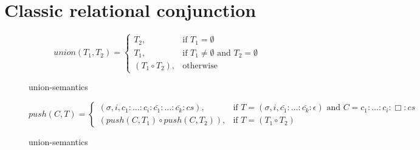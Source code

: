 \section{Classic relational conjunction}

\begin{figure}[h!]
\[
union(T_1, T_2) =
\left\{
\begin{array}{rl}
T_2, & \mbox{if } T_1 = \emptyset \\
T_1, & \mbox{if } T_1 \not= \emptyset \mbox{ and } T_2 = \emptyset \\
(T_1 \circ T_2), & \mbox{otherwise}
\end{array}
\right.
\]
\caption{union-semantics}
\label{fair:union-semantics}
\end{figure}

\begin{figure}[h!]
\[
push(C, T) =
\left\{
\begin{array}{rl}
(\sigma, i, c_1 : \ldots : c_i : \bar{c_1} : \ldots : \bar{c_k} : cs), & \mbox{if } T = (\sigma, i, \bar{c_1} : \ldots : \bar{c_k} : \epsilon) \mbox{ and } C = c_1 : \ldots : c_i : \Box : cs \\
(push(C, T_1) \circ push(C, T_2)), & \mbox{if } T = (T_1 \circ T_2)
\end{array}
\right.
\]
\caption{union-semantics}
\label{fair:union-semantics}
\end{figure}

